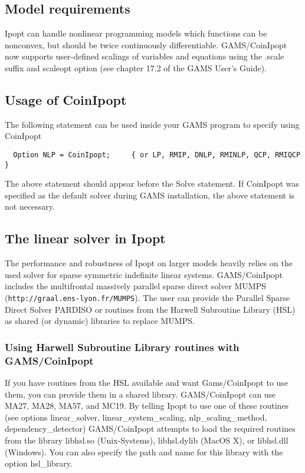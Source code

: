 \subsection{Model requirements}

Ipopt can handle nonlinear programming models which functions can be nonconvex, but should be twice continuously differentiable.
GAMS/CoinIpopt now supports user-defined scalings of variables and equations using the .scale suffix and scaleopt option (see chapter 17.2 of the GAMS User's Guide).

\subsection{Usage of CoinIpopt}

The following statement can be used inside your GAMS program to specify using CoinIpopt
\begin{verbatim}
  Option NLP = CoinIpopt;     { or LP, RMIP, DNLP, RMINLP, QCP, RMIQCP }
\end{verbatim}

The above statement should appear before the Solve statement.
If CoinIpopt was specified as the default solver during GAMS installation, the above statement is not necessary.

\subsection{The linear solver in Ipopt}
\label{ipoptlinearsolver}
\hypertarget{ipoptlinearsolver}{}

The performance and robustness of Ipopt on larger models heavily relies on the used solver for sparse symmetric indefinite linear systems.
GAMS/CoinIpopt includes the multifrontal massively parallel sparse direct solver MUMPS (\texttt{http://graal.ens-lyon.fr/MUMPS}).
The user can provide the Parallel Sparse Direct Solver PARDISO or routines from the Harwell Subroutine Library (HSL) as shared (or dynamic) libraries to replace MUMPS.

\subsubsection{Using Harwell Subroutine Library routines with GAMS/CoinIpopt}

If you have routines from the HSL available and want Gams/CoinIpopt to use them, you can provide them in a shared library.
GAMS/CoinIpopt can use MA27, MA28, MA57, and MC19.
By telling Ipopt to use one of these routines (see options linear\_solver, linear\_system\_scaling, nlp\_scaling\_method, dependency\_detector) GAMS/CoinIpopt attempts to load the required routines from the library libhsl.so (Unix-Systems), libhsl.dylib (MacOS X), or libhsl.dll (Windows).
You can also specify the path and name for this library with the option hsl\_library.

